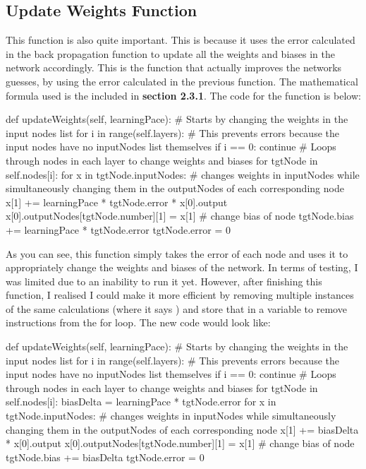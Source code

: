 \documentclass{report}
\begin{document}
\subsection{Update Weights Function}
This function is also quite important. This is because it uses the error calculated in the back propagation function to update all the weights and biases in the network accordingly. This is the function that actually improves the networks guesses, by using the error calculated in the previous function. The mathematical formula used is the included in \textbf{section 2.3.1}. The code for the function is below:
\begin{python}
def updateWeights(self, learningPace):
    # Starts by changing the weights in the input nodes list
    for i in range(self.layers):
        # This prevents errors because the input nodes have no inputNodes list themselves
        if i == 0:
            continue
        # Loops through nodes in each layer to change weights and biases
        for tgtNode in self.nodes[i]:
            for x in tgtNode.inputNodes:
                # changes weights in inputNodes while simultaneously changing them in the outputNodes of each corresponding node
                x[1] += learningPace * tgtNode.error * x[0].output
                x[0].outputNodes[tgtNode.number][1] = x[1]
            # change bias of node
            tgtNode.bias += learningPace * tgtNode.error
            tgtNode.error = 0
\end{python}
As you can see, this function simply takes the error of each node and uses it to appropriately change the weights and biases of the network. In terms of testing, I was limited due to an inability to run it yet. However, after finishing this function, I realised I could make it more efficient by removing multiple instances of the same calculations (where it says ) and store that in a variable to remove instructions from the for loop. The new code would look like:
\begin{python}
def updateWeights(self, learningPace):
    # Starts by changing the weights in the input nodes list
    for i in range(self.layers):
        # This prevents errors because the input nodes have no inputNodes list themselves
        if i == 0:
            continue
        # Loops through nodes in each layer to change weights and biases
        for tgtNode in self.nodes[i]:
            biasDelta = learningPace * tgtNode.error
            for x in tgtNode.inputNodes:
                # changes weights in inputNodes while simultaneously changing them in the outputNodes of each corresponding node
                x[1] += biasDelta * x[0].output
                x[0].outputNodes[tgtNode.number][1] = x[1]
            # change bias of node
            tgtNode.bias += biasDelta
            tgtNode.error = 0
\end{python}
\newpage
\end{document}

